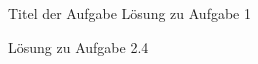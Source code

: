 \documentclass{disloloesung}
\begin{document}
\begin{sheet}{1}
    \begin{aufgabe}{1}{Titel der Aufgabe}
        L\"osung zu Aufgabe 1
    \end{aufgabe}

    \begin{aufgabe*}{2.4}{}
        L\"osung zu Aufgabe 2.4 
    \end{aufgabe*}
\end{sheet}
\end{document}
